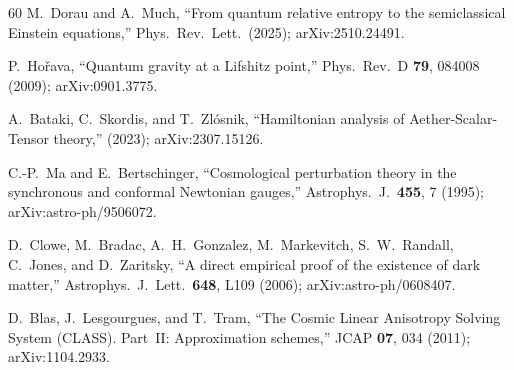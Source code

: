 \documentclass[prd,twocolumn,superscriptaddress,longbibliography,floatfix]{revtex4-2}
\begin{document}
\begin{thebibliography}{60}
M.~Dorau and A.~Much,
``From quantum relative entropy to the semiclassical Einstein
equations,''
Phys.\ Rev.\ Lett.\ (2025); arXiv:2510.24491.

P.~Ho\v{r}ava,
``Quantum gravity at a Lifshitz point,''
Phys.\ Rev.\ D \textbf{79}, 084008 (2009);
arXiv:0901.3775.

A.~Bataki, C.~Skordis, and T.~Zl\'{o}snik,
``Hamiltonian analysis of Aether-Scalar-Tensor theory,''
(2023); arXiv:2307.15126.

C.-P.~Ma and E.~Bertschinger,
``Cosmological perturbation theory in the synchronous and
conformal Newtonian gauges,''
Astrophys.\ J.\ \textbf{455}, 7 (1995);
arXiv:astro-ph/9506072.

D.~Clowe, M.~Bradac, A.~H.~Gonzalez, M.~Markevitch,
S.~W.~Randall, C.~Jones, and D.~Zaritsky,
``A direct empirical proof of the existence of dark matter,''
Astrophys.\ J.\ Lett.\ \textbf{648}, L109 (2006);
arXiv:astro-ph/0608407.

D.~Blas, J.~Lesgourgues, and T.~Tram,
``The Cosmic Linear Anisotropy Solving System (CLASS).
Part~II: Approximation schemes,''
JCAP \textbf{07}, 034 (2011);
arXiv:1104.2933.

\end{thebibliography}
\end{document}
